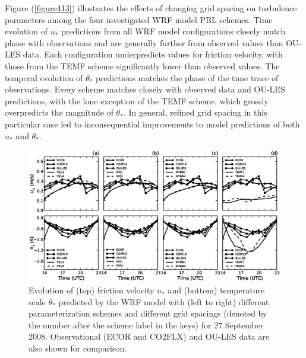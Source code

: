 Figure (\autoref{figure413}) illustrates the effects of changing grid spacing on turbulence parameters among the four investigated WRF model PBL schemes. Time evolution of $u_*$ predictions from all WRF model configurations closely match phase with observations and are generally further from observed values than OU-LES data. Each configuration underpredicts values for friction velocity, with those from the TEMF scheme significantly lower than observed values. The temporal evolution of $\theta_*$ predictions matches the phase of the time trace of observations. Every scheme matches closely with observed data and OU-LES predictions, with the lone exception of the TEMF scheme, which grossly overpredicts the magnitude of $\theta_*$. In general, refined grid spacing in this particular case led to inconsequential improvements to model predictions of both $u_*$ and $\theta_*$. 


\begin{figure}[ht!]
\begin{center}
\includegraphics[width=\textwidth]{figures/chapter4/ust_tst_grid_20080927}
\end{center}
\caption{Evolution of (top) friction velocity $u_*$ and (bottom) temperature scale $\theta_*$ predicted by the WRF model with (left to right) different parameterization schemes and different grid spacings (denoted by the number after the scheme label in the keys) for 27 September 2008. Observational (ECOR and CO2FLX) and OU-LES data are also shown for comparison.}
\label{figure413}
\end{figure}


